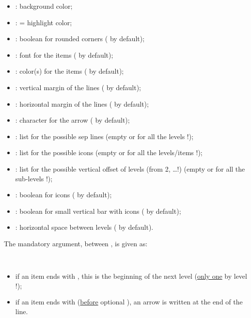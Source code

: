 \documentclass[11pt,a4paper]{ltxdoc}
\begin{document}
\begin{itemize}
	\item {}: background color;
	\item {}: = highlight color;
	\item {}: boolean for rounded corners ( by default);
	\item {}: font for the items ( by default);
	\item {}: color(s) for the items ( by default);
	\item {}: vertical margin of the lines (\MontreCode{6pt} by default);
	\item {}: horizontal margin of the lines (\MontreCode{12pt} by default);
	\item {}: character for the arrow ( by default);
	\item {}: list for the possible sep lines (empty or for all the levels !);
	\item {}: list for the possible icons (empty or for all the levels/items !);
	\item {}: list for the possible vertical offset of levels (from 2, \ldots !) (empty or for all the sub-levels !);
	\item {}: boolean for icons ( by default);
	\item {}: boolean for small vertical bar with icons ( by default);
	\item {}: horizontal space between levels ( by default).
\end{itemize}

\medskip

The mandatory argument, between , is given as:

\smallskip

\hfill{}\hfill~

\begin{itemize}
	\item if an item ends with \MontreCode{(*)}, this is the beginning of the next level (\underline{only one} by level !);
	\item if an item ends with \MontreCode{(>)} (\underline{before} optional \MontreCode{(*)}), an arrow is written at the end of the line.
\end{itemize}
\end{document}
